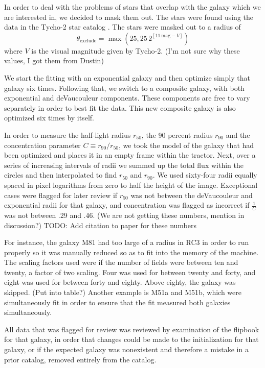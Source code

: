 \documentclass[12pt,preprint,pdftex]{aastex}
\newcommand{\units}[1]{\mathrm{#1}}
\renewcommand{\mag}{\units{mag}}
\newcommand{\rfifty}{r_{50}}
\newcommand{\rninety}{r_{90}}
\newcommand{\conc}{C}
\begin{document}
In order to deal with the problems of stars that overlap with the
galaxy which we are interested in, we decided to mask them out. The
stars were found using the data in the Tycho-2 star catalog \citep{tycho2}.
The stars were masked out to a
radius of
\begin{equation}
\theta_{\mathrm{exclude}} = \max(25, 25\,2^{[11\,\mag-V]})
\end{equation}
where $V$ is the visual magnitude given by Tycho-2.
(I'm not sure why these values, I got them from Dustin)



We start the fitting with an exponential galaxy and then optimize
simply that galaxy six times. Following that, we switch to a composite
galaxy, with both exponential and deVaucouleur components. These
components are free to vary separately in order to best fit the
data. This new composite galaxy is also optimized six times by itself.

In order to measure the half-light radius $\rfifty$, the 90 percent
radius $\rninety$ and the concentration parameter $\conc\equiv
\rninety/\rfifty$, we took the model of the galaxy that had been
optimized and places it in an empty frame within the tractor. Next,
over a series of increasing intervals of radii we summed up the total
flux within the circles and then interpolated to find $\rfifty$ and $\rninety$.
 We used sixty-four radii equally spaced in pixel logarithms from zero
 to half the height of the image. Exceptional cases were flagged for later
 review if $\rfifty$ was not between the deVaucouleur and exponential radii
 for that galaxy, and concentration was flagged as incorrect if $\frac{1}{\conc}$
 was not between .29 and .46. (We are not getting these numbers, mention in
 discussion?) TODO: Add citation to paper for these numbers

For instance, the galaxy M81 had too large of a radius in RC3 in order to run properly so it was manually reduced so as to fit into the memory of the machine. The scaling factors used were if the number of fields were between ten and twenty, a factor of two scaling. Four was used for between twenty and forty, and eight was used for between forty and eighty. Above eighty, the galaxy was skipped. (Put into table?) Another example is M51a and M51b, which were simultaneously fit in order to ensure that the fit measured both galaxies simultaneously. 

All data that was flagged for review was reviewed by examination of the flipbook for that galaxy, in order that changes could be made to the initialization for that galaxy, or if the expected galaxy was nonexistent and therefore a mistake in a prior catalog, removed entirely from the catalog. 
\end{document}

